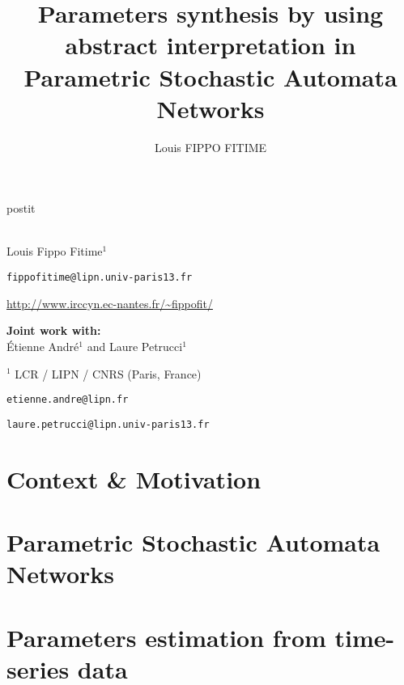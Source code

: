 \documentclass[fleqn,10pt,c]{beamer}
\date{\thedate}
\title[]{Parameters synthesis by using abstract
interpretation in Parametric Stochastic Automata Networks
}
\author{Louis FIPPO FITIME}
\begin{document}




\begin{frame}[plain,label=title]

\begin{center}
\vspace{1cm}
\begin{beamercolorbox}[sep=0.5em]{postit}
\centering
\Large
\textbf{%
{\normalsize\theconference{}}\\~\\%
\inserttitle
}
\end{beamercolorbox}



\par
\medskip
\normalsize
Louis Fippo Fitime$^1$
\footnotesize

\texttt{fippofitime@lipn.univ-paris13.fr}

\url{http://www.irccyn.ec-nantes.fr/~fippofit/}



\bigskip
\textbf{Joint work with:} \\  \'Etienne Andr\'e$^1$ and Laure Petrucci$^1$ 


\medskip
\footnotesize
$^1$ LCR / LIPN / CNRS (Paris, France)

\texttt{etienne.andre@lipn.fr}

\texttt{laure.petrucci@lipn.univ-paris13.fr}


\end{center}

\end{frame}


\section{Context \& Motivation}





\section{Parametric Stochastic Automata Networks}





\section{Parameters estimation from time-series data}
\end{document}
